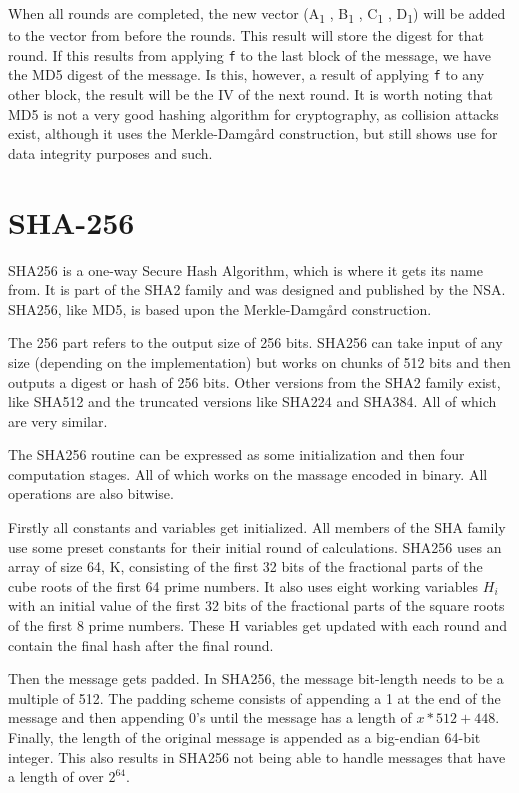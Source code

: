 \documentclass[a4paper, openany]{book}
\begin{document}
When all rounds are completed, the new vector (A\textsubscript{1} , B\textsubscript{1} , C\textsubscript{1} , D\textsubscript{1}) will be added to the vector from before the rounds. This result will store the digest for that round. If this results from applying \texttt{f} to the last block of the message, we have the MD5 digest of the message. Is this, however, a result of applying \texttt{f} to any other block, the result will be the IV of the next round.
It is worth noting that MD5 is not a very good hashing algorithm for cryptography, as collision attacks exist, although it uses the Merkle-Damgård construction, but still shows use for data integrity purposes and such.
\section{SHA-256}
\label{SHAalg}
SHA256 is a one-way Secure Hash Algorithm, which is where it gets its name from.
It is part of the SHA2 family and was designed and published by the NSA.
SHA256, like MD5, is based upon the Merkle-Damgård construction.

The 256 part refers to the output size of 256 bits.
SHA256 can take input of any size (depending on the implementation) but works
on chunks of 512 bits and then outputs a digest or hash of 256 bits.
Other versions from the SHA2 family exist, like SHA512 and the truncated
versions like SHA224 and SHA384. All of which are very similar.

The SHA256 routine can be expressed as some initialization and then four computation stages.
All of which works on the massage encoded in binary. All operations are also bitwise.

Firstly all constants and variables get initialized. All members of the SHA family use some preset constants for their initial round of calculations.
SHA256 uses an array of size 64, K, consisting of the first 32 bits of the fractional parts of the cube roots of the first 64 prime numbers.
It also uses eight working variables \(H_i\) with an initial value of the first 32 bits of the fractional parts of the square roots of the first 8 prime numbers.
These H variables get updated with each round and contain the final hash after the final round.

Then the message gets padded. In SHA256, the message bit-length needs to be a multiple of 512.
The padding scheme consists of appending a 1 at the end of the message and then appending 0's until the message has a length of \(x*512+448\).
Finally, the length of the original message is appended as a big-endian 64-bit integer.
This also results in SHA256 not being able to handle messages that have a length of over \(2^{64}\).
\end{document}
